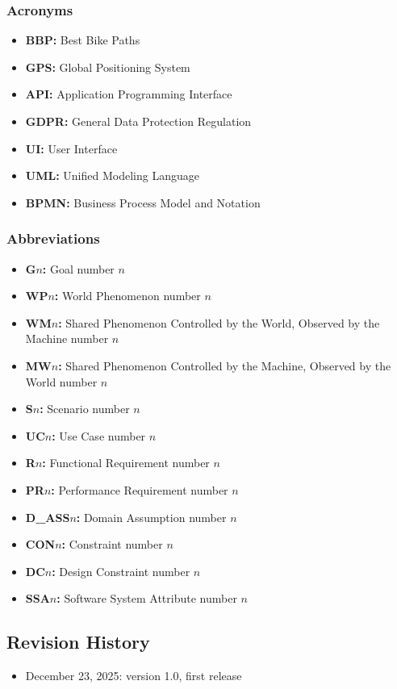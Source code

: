 \subsubsection{Acronyms}
\begin{itemize}
    \item \textbf{BBP:} Best Bike Paths
    \item \textbf{GPS:} Global Positioning System
    \item \textbf{API:} Application Programming Interface
    \item \textbf{GDPR:} General Data Protection Regulation
    \item \textbf{UI:} User Interface
    \item \textbf{UML:} Unified Modeling Language
    \item \textbf{BPMN:} Business Process Model and Notation
\end{itemize}

\subsubsection{Abbreviations}
\begin{itemize}
    \item \textbf{G$n$:} Goal number $n$
    \item \textbf{WP$n$:} World Phenomenon number $n$
    \item \textbf{WM$n$:} Shared Phenomenon Controlled by the World, Observed by the Machine number $n$
    \item \textbf{MW$n$:} Shared Phenomenon Controlled by the Machine, Observed by the World number $n$
    \item \textbf{S$n$:} Scenario number $n$
    \item \textbf{UC$n$:} Use Case number $n$
    \item \textbf{R$n$:} Functional Requirement number $n$
    \item \textbf{PR$n$:} Performance Requirement number $n$
    \item \textbf{D\_ASS$n$:} Domain Assumption number $n$
    \item \textbf{CON$n$:} Constraint number $n$
    \item \textbf{DC$n$:} Design Constraint number $n$
    \item \textbf{SSA$n$:} Software System Attribute number $n$
\end{itemize}
    
\subsection{Revision History}
\begin{itemize}
    \item December 23, 2025: version 1.0, first release
\end{itemize}

